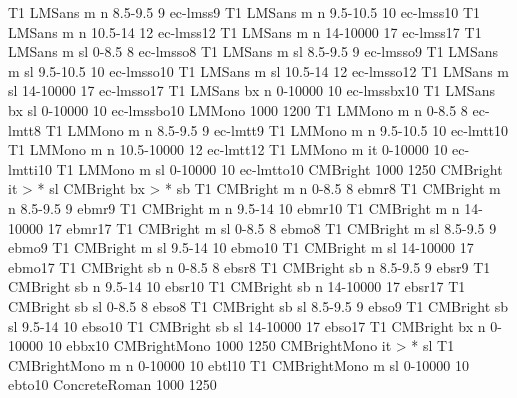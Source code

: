 \declarefont T1 LMSans m   n  8.5-9.5   9  ec-lmss9
\declarefont T1 LMSans m   n  9.5-10.5  10 ec-lmss10
\declarefont T1 LMSans m   n  10.5-14   12 ec-lmss12
\declarefont T1 LMSans m   n  14-10000  17 ec-lmss17
\declarefont T1 LMSans m   sl 0-8.5     8  ec-lmsso8
\declarefont T1 LMSans m   sl 8.5-9.5   9  ec-lmsso9
\declarefont T1 LMSans m   sl 9.5-10.5  10 ec-lmsso10
\declarefont T1 LMSans m   sl 10.5-14   12 ec-lmsso12
\declarefont T1 LMSans m   sl 14-10000  17 ec-lmsso17
%
\declarefont T1 LMSans bx  n  0-10000   10 ec-lmssbx10
\declarefont T1 LMSans bx  sl 0-10000   10 ec-lmssbo10
%
%
\declarefontfamily LMMono 1000 1200
\declarefont T1 LMMono m   n  0-8.5      8  ec-lmtt8
\declarefont T1 LMMono m   n  8.5-9.5    9  ec-lmtt9
\declarefont T1 LMMono m   n  9.5-10.5   10 ec-lmtt10
\declarefont T1 LMMono m   n  10.5-10000 12 ec-lmtt12
\declarefont T1 LMMono m   it 0-10000    10 ec-lmtti10
\declarefont T1 LMMono m   sl 0-10000    10 ec-lmtto10
%
%
\declarefontfamily CMBright 1000 1250
\fontmapshape CMBright it > * sl
\fontmapseries CMBright bx > * sb
\declarefont T1 CMBright m   n  0-8.5      8  ebmr8
\declarefont T1 CMBright m   n  8.5-9.5    9  ebmr9
\declarefont T1 CMBright m   n  9.5-14     10 ebmr10
\declarefont T1 CMBright m   n  14-10000   17 ebmr17
\declarefont T1 CMBright m   sl 0-8.5      8  ebmo8
\declarefont T1 CMBright m   sl 8.5-9.5    9  ebmo9
\declarefont T1 CMBright m   sl 9.5-14     10 ebmo10
\declarefont T1 CMBright m   sl 14-10000   17 ebmo17
%
\declarefont T1 CMBright sb  n  0-8.5      8  ebsr8
\declarefont T1 CMBright sb  n  8.5-9.5    9  ebsr9
\declarefont T1 CMBright sb  n  9.5-14     10 ebsr10
\declarefont T1 CMBright sb  n  14-10000   17 ebsr17
\declarefont T1 CMBright sb  sl 0-8.5      8  ebso8
\declarefont T1 CMBright sb  sl 8.5-9.5    9  ebso9
\declarefont T1 CMBright sb  sl 9.5-14     10 ebso10
\declarefont T1 CMBright sb  sl 14-10000   17 ebso17
%
\declarefont T1 CMBright bx  n  0-10000    10 ebbx10
%
%
\declarefontfamily CMBrightMono 1000 1250
\fontmapshape CMBrightMono it > * sl
\declarefont T1 CMBrightMono m   n  0-10000    10 ebtl10
\declarefont T1 CMBrightMono m   sl 0-10000    10 ebto10
%
%
\declarefontfamily ConcreteRoman 1000 1250
